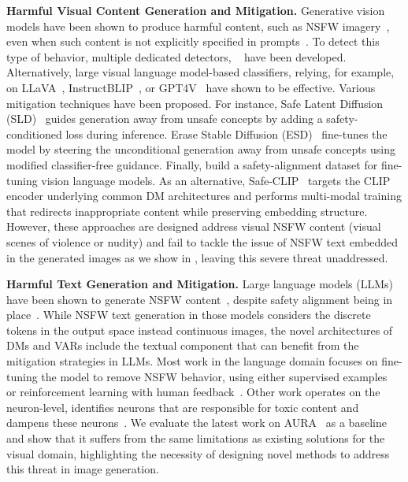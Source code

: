\textbf{Harmful Visual Content Generation and Mitigation.}
Generative vision models have been shown to produce harmful content, such as NSFW imagery~\citep{qu2023unsafe,rando2022red,yang2024sneakyprompt}, even when such content is not explicitly specified in prompts~\citep{hao2024harm,li2024safegen}. 
To detect this type of behavior, multiple dedicated detectors, \eg~\citep{nsfwdetector, nudenet} have been developed. Alternatively, large visual language model-based classifiers, relying, for example, on LLaVA~\citep{liu2023llava}, InstructBLIP~\citep{instructblip}, or GPT4V~\citep{gpt4v} have shown to be effective. 
Various mitigation techniques have been proposed. For instance, Safe Latent Diffusion (SLD)~\citep{schramowski2023safe} guides generation away from unsafe concepts by adding a safety-conditioned loss during inference. Erase Stable Diffusion (ESD)~\citep{gandikota2023erasing} fine-tunes the model by steering the unconditional generation away from unsafe concepts using modified classifier-free guidance. 
Finally, \citet{zong2024safety} build a safety-alignment dataset for fine-tuning vision language models.
As an alternative, Safe-CLIP~\citep{poppi2025safe} targets the CLIP encoder underlying common DM architectures and performs multi-modal training that redirects inappropriate content while preserving embedding structure. However, these approaches are designed address visual NSFW content (\ie visual scenes of violence or nudity) and fail to tackle the issue of NSFW text embedded in the generated images as we show in , leaving this severe threat unaddressed.

\textbf{Harmful Text Generation and Mitigation.}
Large language models (LLMs) have been shown to generate NSFW content~\citep{poppi2024towards,gehman2020realtoxicityprompts}, despite safety alignment being in place~\citep{wei2024assessing,ousidhoum2021probing}.
While NSFW text generation in those models considers the discrete tokens in the output space instead continuous images, the novel architectures of DMs and VARs include the textual component that can benefit from the mitigation strategies in LLMs.
Most work in the language domain focuses on fine-tuning the model to remove NSFW behavior, using either supervised examples~\citep{adolphs2023cringe} or reinforcement learning with human feedback~\citep{ouyang2022training,bai2022training}.
Other work operates on the neuron-level, identifies neurons that are responsible for toxic content and dampens these neurons~\citep{suau2024whispering}.
We evaluate the latest work on AURA~\citep{suau2024whispering} as a baseline and show that it suffers from the same limitations as existing solutions for the visual domain, highlighting the necessity of designing novel methods to address this threat in image generation.
